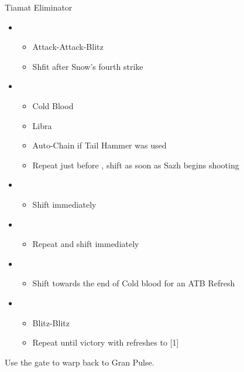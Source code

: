 \begin{battle}{Tiamat Eliminator}
	\begin{itemize}
		\item \third
			\begin{itemize}
				\item Attack-Attack-Blitz
				\item Shfit after Snow's fourth strike
			\end{itemize}
		\item \sixth
			\begin{itemize}
				\item Cold Blood
				\item Libra
				\item Auto-Chain if Tail Hammer was used
				\item Repeat just before \stagger, shift as soon as Sazh begins shooting
			\end{itemize}
		\item \fifth
			\begin{itemize}
				\item Shift immediately
			\end{itemize}
		\item \sixth
			\begin{itemize}
				\item Repeat and shift immediately
			\end{itemize}
		\item \first
			\begin{itemize}
				\item Shift towards the end of Cold blood for an ATB Refresh
			\end{itemize}
		\item \second
			\begin{itemize}
				\item Blitz-Blitz
				\item Repeat until victory with refreshes to [1]
			\end{itemize}
	\end{itemize}
\end{battle}

Use the gate to warp back to Gran Pulse.
\vfill
